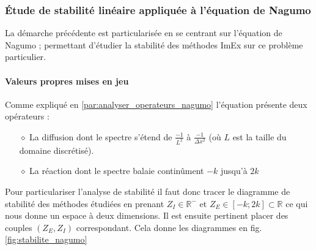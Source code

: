 \subsubsection{Étude de stabilité linéaire appliquée à l'équation de Nagumo}
    La démarche précédente est particularisée en se centrant sur l'équation de Nagumo ; 
    permettant d'étudier la stabilité des méthodes ImEx sur ce problème particulier.
    \paragraph{Valeurs propres mises en jeu}
        Comme expliqué en \ref{par:analyser_operateurs_nagumo} l'équation présente deux opérateurs : 
        \begin{itemize}
            \item[$\diamond$] La diffusion dont le spectre s'étend de $\frac{-1}{L^2}$ à $\frac{-1}{\Delta x^2}$ (où $L$ est la taille du domaine discrétisé).
            \item[$\diamond$] La réaction dont le spectre balaie continûment $-k$ jusqu'à $2k$
        \end{itemize}
        Pour particulariser l'analyse de stabilité il faut donc tracer le diagramme de stabilité des méthodes étudiées en prenant $Z_I \in \mathbb{R}^-$ 
        et $Z_E \in [-k;2k] \subset \mathbb{R}$ ce qui nous donne un espace à deux dimensions. Il est ensuite pertinent placer des couples $(Z_E,Z_I)$ correspondant.
        Cela donne les diagrammes en fig. \ref{fig:stabilite_nagumo}
